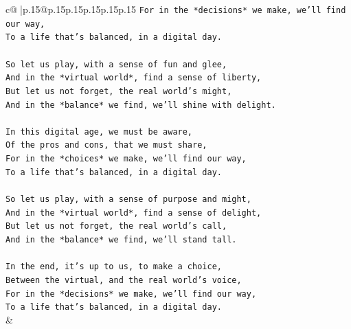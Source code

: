 \documentclass{article}
\begin{document}
{\begin{supertabular}{c@{$\;$}|p{.15\linewidth}@{}p{.15\linewidth}p{.15\linewidth}p{.15\linewidth}p{.15\linewidth}p{.15\linewidth}}
{{{\texttt{For in the *decisions* we make, we'll find our way,} \\
\texttt{To a life that's balanced, in a digital day.} \\
\\ 
\texttt{So let us play, with a sense of fun and glee,} \\
\texttt{And in the *virtual world*, find a sense of liberty,} \\
\texttt{But let us not forget, the real world's might,} \\
\texttt{And in the *balance* we find, we'll shine with delight.} \\
\\ 
\texttt{In this digital age, we must be aware,} \\
\texttt{Of the pros and cons, that we must share,} \\
\texttt{For in the *choices* we make, we'll find our way,} \\
\texttt{To a life that's balanced, in a digital day.} \\
\\ 
\texttt{So let us play, with a sense of purpose and might,} \\
\texttt{And in the *virtual world*, find a sense of delight,} \\
\texttt{But let us not forget, the real world's call,} \\
\texttt{And in the *balance* we find, we'll stand tall.} \\
\\ 
\texttt{In the end, it's up to us, to make a choice,} \\
\texttt{Between the virtual, and the real world's voice,} \\
\texttt{For in the *decisions* we make, we'll find our way,} \\
\texttt{To a life that's balanced, in a digital day.} \\
            }
        }
    }
    & \\ \\


\end{supertabular}}
\end{document}
